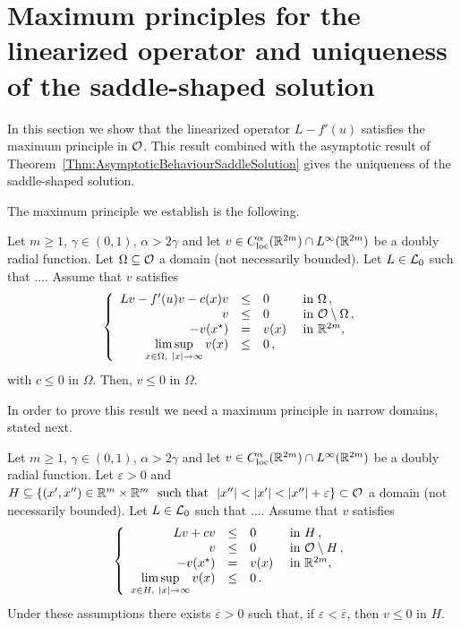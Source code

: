 \section{Maximum principles for the linearized operator and uniqueness of the saddle-shaped solution}
\label{Sec:MaximumPrinciple}

In this section we show that the linearized operator $L -f'(u)$ satisfies the maximum principle in $\mathcal{O}$. This result combined with the asymptotic result of Theorem~\ref{Thm:AsymptoticBehaviourSaddleSolution} gives the uniqueness of the saddle-shaped solution.

The maximum principle we establish is the following.

\begin{proposition}
	\label{Prop:MaximumPrincipleInO}
	Let $m\geq 1$, $\gamma \in (0,1)$, $\alpha > 2\gamma$ and let $v\in C^\alpha_{\mathrm{loc}}(\mathbb{R}^{2m})\cap L^\infty(\mathbb{R}^{2m})$ be a doubly radial function. Let $\Omega \subseteq \mathcal{O}$ a domain (not necessarily bounded). Let $L \in \mathcal{L}_0$ such that .... Assume that $v$ satisfies
	$$
	\left\{\begin{array}{rcll}
	Lv - f'(u)v - c(x)v &\leq & 0 &\textrm{ in } \Omega\,,\\
	v &\leq & 0 &\textrm{ in } \mathcal{O} \setminus \Omega\,,\\
	- v(x^\star) & = & v(x) &\textrm{ in } \mathbb{R}^{2m},\\
	\displaystyle \limsup_{x\in \Omega, \ |x|\to \infty} v(x) &\leq & 0\,,
	\end{array} \right.
	$$
	with $c\leq 0$ in $\Omega$.
	Then, $v \leq 0$ in $\Omega$.
\end{proposition}

In order to prove this result we need a maximum principle in narrow domains, stated next.

\begin{proposition}
	\label{Prop:MaximumPrincipleNarrowDomainsOdd}
	Let $m\geq 1$, $\gamma \in (0,1)$, $\alpha > 2\gamma$ and let $v\in C^\alpha_{\mathrm{loc}}(\mathbb{R}^{2m})\cap L^\infty(\mathbb{R}^{2m})$ be a doubly radial function. Let $\varepsilon>0$ and $H \subseteq \{(x',x'')\in \R^m\times\R^m \ \text{ such that }\ |x''|<|x'|<|x''|+ \varepsilon\} \subset \ocal$ a domain (not necessarily bounded). Let $L \in \mathcal{L}_0$ such that .... Assume that $v$ satisfies
	\begin{equation}
	\label{Eq:AssumptionsMaxPNarrow}
	\left\{\begin{array}{rcll}
	Lv + cv&\leq & 0 &\textrm{ in } H\,,\\
	v &\leq & 0 &\textrm{ in } \mathcal{O} \setminus H\,,\\
	- v(x^\star) & = & v(x) &\textrm{ in } \mathbb{R}^{2m},\\
	\displaystyle \limsup_{x\in H, \ |x|\to \infty} v(x) &\leq & 0\,.
	\end{array} \right.
	\end{equation}
	Under these assumptions there exists $\overline{\varepsilon}>0$ such that, if $\varepsilon<\overline{\varepsilon}$, then $v \leq 0$ in $H$.
\end{proposition}


